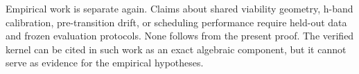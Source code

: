 \documentclass[10pt]{article}
\begin{document}
Empirical work is separate again. Claims about shared viability geometry,
h-band calibration, pre-transition drift, or scheduling performance require
held-out data and frozen evaluation protocols. None follows from the present
proof. The verified kernel can be cited in such work as an exact algebraic
component, but it cannot serve as evidence for the empirical hypotheses.

\clearpage
\appendix

\end{document}

